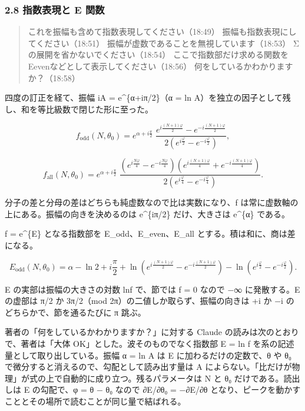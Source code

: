 \documentclass[
  a4paper,
]{ltjsarticle}
\begin{document}
\subsubsection{2.8 指数表現と E
関数}\label{ux6307ux6570ux8868ux73feux3068-e-ux95a2ux6570}

\begin{quote}
これを振幅も含めて指数表現してください（18:49）
振幅も指数表現にしてください（18:51）
振幅が虚数であることを無視しています（18:53）
Σの展開を省かないでください（18:54）
ここで指数部だけ求める関数をEevenなどとして表示してください（18:56）
何をしているかわかりますか？（18:58）
\end{quote}

四度の訂正を経て、振幅 iA = e\^{}\{α+iπ/2\}（α = ln
A）を独立の因子として残し、和を等比級数で閉じた形に至った。

\[
f_{\mathrm{odd}}(N,\theta_0)=e^{\alpha+i\frac{\pi}{2}}\;\frac{e^{i\frac{(N+1)\varphi}{2}}-e^{-i\frac{(N+1)\varphi}{2}}}{2\left(e^{i\frac{\varphi}{2}}-e^{-i\frac{\varphi}{2}}\right)},
\]

\[
f_{\mathrm{all}}(N,\theta_0)=e^{\alpha+i\frac{\pi}{2}}\;\frac{\left(e^{i\frac{N\varphi}{4}}-e^{-i\frac{N\varphi}{4}}\right)\left(e^{i\frac{(N+1)\varphi}{4}}+e^{-i\frac{(N+1)\varphi}{4}}\right)}{2\left(e^{i\frac{\varphi}{4}}-e^{-i\frac{\varphi}{4}}\right)}.
\]

分子の差と分母の差はどちらも純虚数なので比は実数になり、f
は常に虚数軸の上にある。振幅の向きを決めるのは e\^{}\{iπ/2\}
だけ、大きさは e\^{}\{α\} である。

f = e\^{}\{E\} となる指数部を E\_odd、E\_even、E\_all
とする。積は和に、商は差になる。

\[
E_{\mathrm{odd}}(N,\theta_0)=\alpha-\ln2+i\frac{\pi}{2}+\ln\!\left(e^{i\frac{(N+1)\varphi}{2}}-e^{-i\frac{(N+1)\varphi}{2}}\right)-\ln\!\left(e^{i\frac{\varphi}{2}}-e^{-i\frac{\varphi}{2}}\right).
\]

E の実部は振幅の大きさの対数 ln\textbar f\textbar{} で、節では
\textbar f\textbar{} = 0 なので −∞ に発散する。E の虚部は π/2 か
3π/2（mod 2π）の二値しか取らず、振幅の向きは +i か −i
のどちらかで、節を通るたびに π 跳ぶ。

著者の「何をしているかわかりますか？」に対する Claude
の読みは次のとおりで、著者は「大体 OK」とした。波そのものでなく指数部 E
= ln f を系の記述量として取り出している。振幅 α = ln A は E
に加わるだけの定数で、θ や θ₀
で微分すると消えるので、勾配として読み出す量は A
によらない。「比だけが物理」が式の上で自動的に成り立つ。残るパラメータは
N と θ₀ だけである。読出しは E の勾配で、φ = θ − θ₀ なので ∂E/∂θ₀ =
−∂E/∂θ
となり、ピークを動かすこととその場所で読むことが同じ量で結ばれる。
\end{document}
